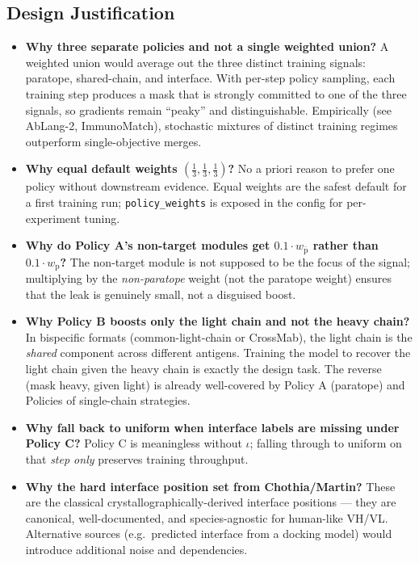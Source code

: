 \documentclass[11pt]{article}
\begin{document}
\subsection{Design Justification}
\begin{itemize}
\item \textbf{Why three separate policies and not a single weighted
union?} A weighted union would average out the three distinct
training signals: paratope, shared-chain, and interface. With
per-step policy sampling, each training step produces a mask that is
strongly committed to one of the three signals, so gradients remain
``peaky'' and distinguishable. Empirically (see AbLang-2,
ImmunoMatch), stochastic mixtures of distinct training regimes
outperform single-objective merges.
\item \textbf{Why equal default weights $(\tfrac13, \tfrac13, \tfrac13)$?}
No a priori reason to prefer one policy without downstream evidence.
Equal weights are the safest default for a first training run;
\texttt{policy\_weights} is exposed in the config for per-experiment
tuning.
\item \textbf{Why do Policy A's non-target modules get
$0.1 \cdot w_{\bar{\text{p}}}$ rather than $0.1 \cdot w_{\text{p}}$?}
The non-target module is not supposed to be the focus of the signal;
multiplying by the \emph{non-paratope} weight (not the paratope
weight) ensures that the leak is genuinely small, not a disguised
boost.
\item \textbf{Why Policy B boosts only the light chain and not the
heavy chain?} In bispecific formats (common-light-chain or CrossMab),
the light chain is the \emph{shared} component across different
antigens. Training the model to recover the light chain given the
heavy chain is exactly the design task. The reverse (mask heavy,
given light) is already well-covered by Policy A (paratope) and
Policies of single-chain strategies.
\item \textbf{Why fall back to uniform when interface labels are missing
under Policy C?} Policy C is meaningless without $\iota$; falling
through to uniform on that \emph{step only} preserves training
throughput.
\item \textbf{Why the hard interface position set from
Chothia/Martin?} These are the classical crystallographically-derived
interface positions --- they are canonical, well-documented, and
species-agnostic for human-like VH/VL. Alternative sources
(e.g.\ predicted interface from a docking model) would introduce
additional noise and dependencies.
\end{itemize}
\end{document}
